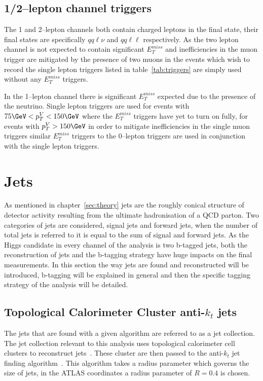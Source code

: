 \subsection{1/2--lepton channel triggers}
The 1 and 2--lepton channels both contain charged leptons in the final state,
their final states are specifically $qq\ell\nu$ and $qq\ell\ell$ respectively.
As the two lepton channel is not expected to contain significant $E_T^{miss}$
and inefficiencies in the muon trigger are mitigated by the presence of two
muons in the events which wish to record the single lepton triggers listed in
table~\ref{tab:triggers} are simply used without any $E_T^{miss}$ triggers.

In the 1--lepton channel there is significant $E_T^{miss}$ expected due to the
presence of the neutrino. Single lepton triggers are used for events with $75
\GeV < p_T^{V} < 150 \GeV$ where the $E_T^{miss}$ triggers have yet to turn on
fully, for events with $p_T^{V} > 150 \GeV$ in order to mitigate inefficiencies
in the single muon triggers similar $E_T^{miss}$ triggers to the 0--lepton
triggers are used in conjunction with the single lepton triggers.


\section{Jets}
\label{sec:jets}

As mentioned in chapter~\ref{sec:theory} jets are the roughly conical structure
of detector activity resulting from the ultimate hadronisation of a QCD parton.
Two categories of jets are considered, signal jets and forward jets, when the
number of total jets is referred to it is equal to the sum of signal and forward
jets. As the Higgs candidate in every channel of the analysis is two b-tagged
jets, both the reconstruction of jets and the b-tagging strategy have huge
impacts on the final measurements. In this section the way jets are found and
reconstructed will be introduced, b-tagging will be explained in general and
then the specific tagging strategy of the analysis will be detailed.

\subsection{Topological Calorimeter Cluster anti-$k_t$ jets}
The jets that are found with a given algorithm are referred to as a jet
collection. The jet collection relevant to this analysis uses topological
calorimeter cell clusters to reconstruct jets~\cite{emtopo}. These cluster are
then passed to the anti-$k_t$ jet finding algorithm~\cite{anti-kt}. This
algorithm takes a radius parameter which governs the size of jets, in the ATLAS
coordinates a radius parameter of $R=0.4$ is chosen.

